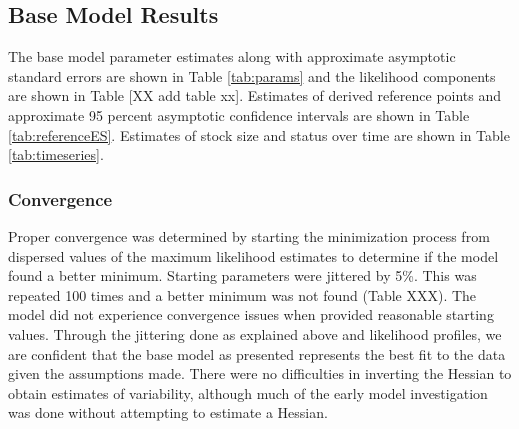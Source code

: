 \documentclass[11pt,
  english,
  a4paper,
]{article}
\begin{document}

\hypertarget{base-model-results}{%
\subsection{Base Model Results}\label{base-model-results}}

\leavevmode\tagmcend\tagstructend


The base model parameter estimates along with approximate asymptotic standard errors are shown in Table \ref{tab:params} and the likelihood components are shown in Table {[}XX add table xx{]}. Estimates of derived reference points and approximate 95 percent asymptotic confidence intervals are shown in Table \ref{tab:referenceES}. Estimates of stock size and status over time are shown in Table \ref{tab:timeseries}.

\leavevmode\tagmcend\tagstructend\par


\hypertarget{convergence}{%
\subsubsection{Convergence}\label{convergence}}

\leavevmode\tagmcend\tagstructend


Proper convergence was determined by starting the minimization process from dispersed values of the maximum likelihood estimates to determine if the model found a better minimum. Starting parameters were jittered by 5\%. This was repeated 100 times and a better minimum was not found (Table XXX). The model did not experience convergence issues when provided reasonable starting values. Through the jittering done as explained above and likelihood profiles, we are confident that the base model as presented represents the best fit to the data given the assumptions made. There were no difficulties in inverting the Hessian to obtain estimates of variability, although much of the early model investigation was done without attempting to estimate a Hessian.

\leavevmode\tagmcend\tagstructend\par

\end{document}
